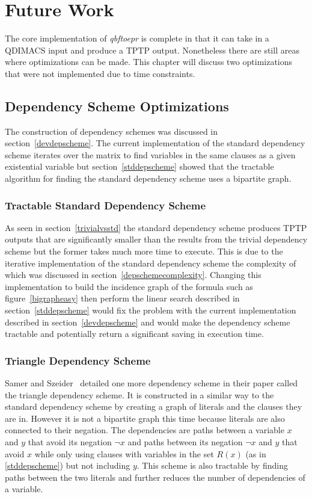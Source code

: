 \chapter{Future Work}
The core implementation of \textit{qbftoepr} is complete in that it can take in a QDIMACS input and produce a TPTP output. Nonetheless there are still areas where optimizations can be made. This chapter will discuss two optimizations that were not implemented due to time constraints.

\section{Dependency Scheme Optimizations}
The construction of dependency schemes was discussed in section~\ref{devdepscheme}. The current implementation of the standard dependency scheme iterates over the matrix to find variables in the same clauses as a given existential variable but section~\ref{stddepscheme} showed that the tractable algorithm for finding the standard dependency scheme uses a bipartite graph.

\subsection{Tractable Standard Dependency Scheme} \label{tractablestddepscheme}
As seen in section~\ref{trivialvsstd} the standard dependency scheme produces TPTP outputs that are significantly smaller than the results from the trivial dependency scheme but the former takes much more time to execute. This is due to the iterative implementation of the standard dependency scheme the complexity of which was discussed in section~\ref{depschemecomplexity}. Changing this implementation to build the incidence graph of the formula such as figure~\ref{bigrapheasy} then perform the linear search described in section~\ref{stddepscheme} would fix the problem with the current implementation described in section~\ref{devdepscheme} and would make the dependency scheme tractable and potentially return a significant saving in execution time.

\subsection{Triangle Dependency Scheme}
Samer and Szeider~\cite{backdoorsets} detailed one more dependency scheme in their paper called the triangle dependency scheme. It is constructed in a similar way to the standard dependency scheme by creating a graph of literals and the clauses they are in. However it is not a bipartite graph this time because literals are also connected to their negation. The dependencies are paths between a variable $x$ and $y$ that avoid its negation $\neg x$ and paths between its negation $\neg x$ and $y$ that avoid $x$ while only using clauses with variables in the set $R(x)$ (as in \ref{stddepscheme}) but not including $y$. This scheme is also tractable by finding paths between the two literals and further reduces the number of dependencies of a variable.

